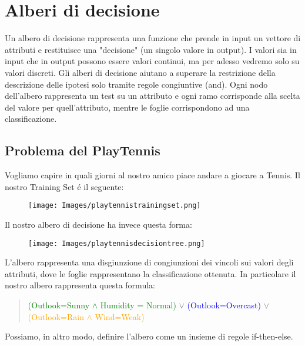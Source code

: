 \documentclass{article}
\begin{document}
\section{Alberi di decisione}
Un albero di decisione rappresenta una funzione che prende in input un vettore di attributi e restituisce una "decisione" (un singolo valore in output). I valori sia in input che in output possono essere valori continui, ma per adesso vedremo solo su valori discreti. Gli alberi di decisione aiutano a superare la restrizione della descrizione delle ipotesi solo tramite regole congiuntive (and). Ogni nodo dell'albero rappresenta un test su un attributo e ogni ramo corrisponde alla scelta del valore per quell'attributo, mentre le foglie corrispondono ad una classificazione. 

\subsection{Problema del PlayTennis}
Vogliamo capire in quali giorni al nostro amico piace andare a giocare a Tennis. Il nostro Training Set é il seguente:
\begin{figure}[H]
\centering
\texttt{[image: Images/playtennistrainingset.png]}
\end{figure}
Il nostro albero di decisione ha invece questa forma:
\begin{figure}[H]
\centering
\texttt{[image: Images/playtennisdecisiontree.png]}
\end{figure}
\clearpage
L'albero rappresenta una disgiunzione di congiunzioni dei vincoli sui valori degli attributi, dove le foglie rappresentano la classificazione ottenuta.
In particolare il nostro albero rappresenta questa formula:
\begin{quote}
    \textcolor{green}{(Outlook=Sunny $\land$ Humidity = Normal)} $\lor$ \newline
    \textcolor{blue}{(Outlook=Overcast)} $\lor$ \newline
    \textcolor{orange}{(Outlook=Rain $\land$ Wind=Weak)}
\end{quote}
Possiamo, in altro modo, definire l'albero come un insieme di regole if-then-else.
\end{document}
